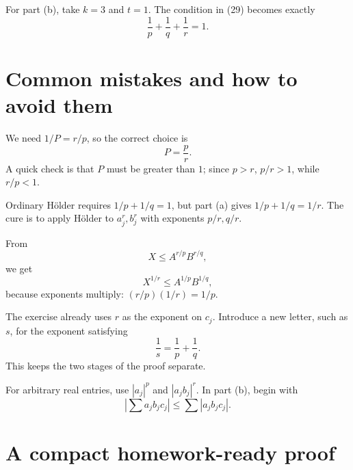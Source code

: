 \documentclass[11pt]{article}
\newcommand{\abs}[1]{\left|#1\right|}
\begin{document}
For part (b), take \(k=3\) and \(t=1\). The condition in (29) becomes exactly
\[
  \frac1p+\frac1q+\frac1r=1.
\]

\section{Common mistakes and how to avoid them}

\begin{warningBox}[Mistake 1: choosing \(P=r/p\) instead of \(P=p/r\)]
We need \(1/P=r/p\), so the correct choice is
\[
  P=\frac{p}{r}.
\]
A quick check is that \(P\) must be greater than \(1\); since \(p>r\), \(p/r>1\), while \(r/p<1\).
\end{warningBox}

\begin{warningBox}
Ordinary H\"older requires \(1/p+1/q=1\), but part (a) gives \(1/p+1/q=1/r\). The cure is to apply H\"older to \(a_j^r,b_j^r\) with exponents \(p/r,q/r\).
\end{warningBox}

\begin{warningBox}
From
\[
  X\leq A^{r/p}B^{r/q},
\]
we get
\[
  X^{1/r}\leq A^{1/p}B^{1/q},
\]
because exponents multiply: \((r/p)(1/r)=1/p\).
\end{warningBox}

\begin{warningBox}
The exercise already uses \(r\) as the exponent on \(c_j\). Introduce a new letter, such as \(s\), for the exponent satisfying
\[
  \frac1s=\frac1p+\frac1q.
\]
This keeps the two stages of the proof separate.
\end{warningBox}

\begin{warningBox}
For arbitrary real entries, use \(\abs{a_j}^p\) and \(\abs{a_jb_j}^r\). In part (b), begin with
\[
  \abs{\sum a_jb_jc_j}\leq\sum\abs{a_jb_jc_j}.
\]
\end{warningBox}

\section{A compact homework-ready proof}
\end{document}

